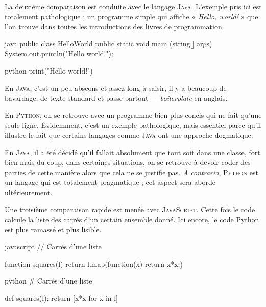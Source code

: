 
La deuxième comparaison est conduite avec le langage \textsc{Java}. L'exem\-ple pris ici est totalement pathologique ; un programme simple qui affiche « \textit{Hello, world!} » que l'on trouve dans toutes les introductions des livres de programmation.

\begin{jazzcode*}
\caption{\label{lst:X.2}Comparaison d'un programme « \emph{Hello world!} » en \textsc{Java} et en \textsc{Python}.}
\begin{codebox}[width=0.45\linewidth, nobeforeafter]{java}
public class HelloWorld
{
	public static void main (string[] args)
	{
		System.out.println("Hello world!");
	}
}
\end{codebox}
\qquad\quad %
\begin{codebox}[width=0.265\linewidth, nobeforeafter]{python}
print("Hello world!")
\end{codebox}
\end{jazzcode*}

En \textsc{Java}, c'est un peu abscons et assez long à saisir, il y a beaucoup de bavardage, de texte standard et passe-partout --- \textit{boilerplate} en anglais.


En \textsc{Python}, on se retrouve avec un programme bien plus concis qui ne fait qu'une seule ligne. 
Évidemment, c'est un exemple pathologique, mais essentiel parce qu'il illustre le fait que certains langages comme \textsc{Java} ont une approche dogmatique.

En \textsc{Java}, il a été décidé qu'il fallait absolument que tout soit dans une classe, fort bien mais du coup, dans certaines situations, on se retrouve à devoir coder des parties de cette manière alors que cela ne se justifie pas. \textit{A contrario}, \textsc{Python} est un langage qui est totalement pragmatique ; cet aspect sera abordé ultérieurement.

Une troisième comparaison rapide est menée avec \textsc{JavaScript}. Cette fois le code calcule la liste des carrés d'un certain ensemble donné. Ici encore, le code Python est plus ramassé et plus lisible.

\begin{jazzcode*}
\caption{\label{lst:X.3}Codage du carré des éléments d'une liste en \textsc{JavaScript} et en \textsc{Python}.}
\begin{codebox}[width=0.45\linewidth, nobeforeafter]{javascript}
// Carrés d'une liste

function squares(l) {
	return l.map(function(x) {return x*x;})
}
\end{codebox}
\qquad\quad %
\begin{codebox}[width=0.3\linewidth, nobeforeafter]{python}
# Carrés d'une liste

def squares(l):
	return [x*x for x in l]
\end{codebox}
\end{jazzcode*}

